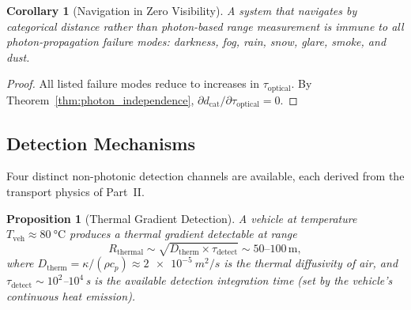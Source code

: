 \documentclass[11pt,twocolumn,a4paper]{article}
\theoremstyle{plain}
\newtheorem{proposition}[theorem]{Proposition}
\newtheorem{corollary}[theorem]{Corollary}
\theoremstyle{definition}
\theoremstyle{remark}
\newcommand{\dcat}{d_{\mathrm{cat}}}
\newcommand{\Dtherm}{D_{\mathrm{therm}}}
\begin{document}
\begin{corollary}[Navigation in Zero Visibility]
\label{cor:zero_vis}
A system that navigates by categorical distance rather than photon-based range measurement is immune to all photon-propagation failure modes: darkness, fog, rain, snow, glare, smoke, and dust.
\end{corollary}

\begin{proof}
All listed failure modes reduce to increases in $\tau_{\mathrm{optical}}$. By Theorem~\ref{thm:photon_independence}, $\partial \dcat / \partial \tau_{\mathrm{optical}} = 0$.
\end{proof}

\subsection{Detection Mechanisms}

Four distinct non-photonic detection channels are available, each derived from the transport physics of Part~II.

\begin{proposition}[Thermal Gradient Detection]
\label{prop:thermal}
A vehicle at temperature $T_{\mathrm{veh}} \approx \SI{80}{\celsius}$ produces a thermal gradient detectable at range
\begin{equation}
R_{\mathrm{thermal}} \sim \sqrt{\Dtherm \times \tau_{\mathrm{detect}}} \sim 50\text{--}100\,\text{m},
\label{eq:R_thermal}
\end{equation}
where $\Dtherm = \kappa / (\rho c_p) \approx \SI{2e-5}{m^2/s}$ is the thermal diffusivity of air, and $\tau_{\mathrm{detect}} \sim 10^2$--$10^4$\,s is the available detection integration time (set by the vehicle's continuous heat emission).
\end{proposition}
\end{document}
